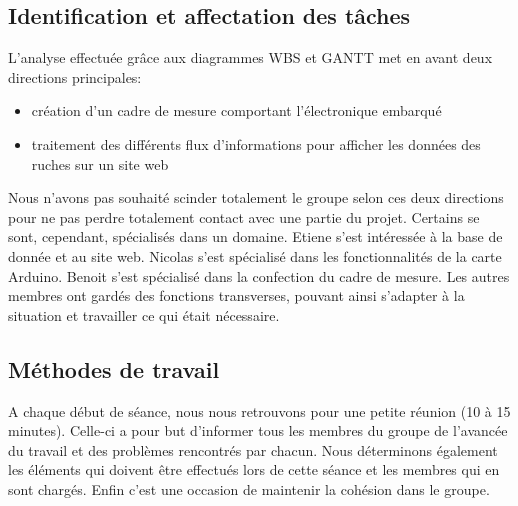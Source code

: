 \subsection{Identification et affectation des tâches}
\vspace{2cm}
L'analyse effectuée grâce aux diagrammes WBS et GANTT met en avant deux directions principales:
\\
\begin{itemize}
\item création d'un cadre de mesure comportant l'électronique embarqué
\item traitement des différents flux d'informations pour afficher les données des ruches sur un site web\\
\end{itemize}

Nous n'avons pas souhaité scinder totalement le groupe selon ces deux directions pour ne pas perdre totalement contact avec une partie du projet. Certains se sont, cependant, spécialisés dans un domaine. Etiene s'est intéressée à la base de donnée et au site web. Nicolas s'est spécialisé dans les fonctionnalités de la carte Arduino. Benoit s'est spécialisé dans la confection du cadre de mesure. Les autres membres ont gardés des fonctions transverses, pouvant ainsi s'adapter à la situation et travailler ce qui était nécessaire.
  
\subsection{Méthodes de travail}
\vspace{2cm}
A chaque début de séance, nous nous retrouvons pour une petite réunion (10 à 15 minutes). Celle-ci a pour but d'informer tous les membres du groupe de l'avancée du travail et des problèmes rencontrés par chacun. Nous déterminons également les éléments qui doivent être effectués lors de cette séance et les membres qui en sont chargés. Enfin c'est une occasion de maintenir la cohésion dans le groupe.